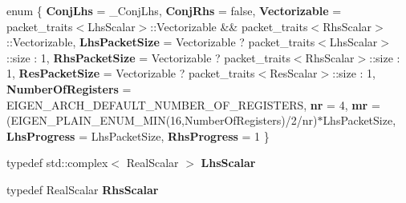 \begin{DoxyCompactItemize}
\item 
\mbox{\label{class_eigen_1_1internal_1_1gebp__traits_3_01std_1_1complex_3_01_real_scalar_01_4_00_01_real_scald728c008ac4da8a5a1327d1e06be8c1f_ac371542e3e56658183b796f8ef01c6f0}} 
enum \{ \newline
{\bfseries Conj\+Lhs} = \+\_\+\+Conj\+Lhs, 
{\bfseries Conj\+Rhs} = false, 
{\bfseries Vectorizable} = packet\+\_\+traits$<$Lhs\+Scalar$>$\+::Vectorizable \&\& packet\+\_\+traits$<$Rhs\+Scalar$>$\+::Vectorizable, 
{\bfseries Lhs\+Packet\+Size} = Vectorizable ? packet\+\_\+traits$<$Lhs\+Scalar$>$\+::size \+: 1, 
\newline
{\bfseries Rhs\+Packet\+Size} = Vectorizable ? packet\+\_\+traits$<$Rhs\+Scalar$>$\+::size \+: 1, 
{\bfseries Res\+Packet\+Size} = Vectorizable ? packet\+\_\+traits$<$Res\+Scalar$>$\+::size \+: 1, 
{\bfseries Number\+Of\+Registers} = E\+I\+G\+E\+N\+\_\+\+A\+R\+C\+H\+\_\+\+D\+E\+F\+A\+U\+L\+T\+\_\+\+N\+U\+M\+B\+E\+R\+\_\+\+O\+F\+\_\+\+R\+E\+G\+I\+S\+T\+E\+RS, 
{\bfseries nr} = 4, 
\newline
{\bfseries mr} = (E\+I\+G\+E\+N\+\_\+\+P\+L\+A\+I\+N\+\_\+\+E\+N\+U\+M\+\_\+\+M\+IN(16,Number\+Of\+Registers)/2/nr)$\ast$\+Lhs\+Packet\+Size, 
{\bfseries Lhs\+Progress} = Lhs\+Packet\+Size, 
{\bfseries Rhs\+Progress} = 1
 \}
\item 
\mbox{\label{class_eigen_1_1internal_1_1gebp__traits_3_01std_1_1complex_3_01_real_scalar_01_4_00_01_real_scald728c008ac4da8a5a1327d1e06be8c1f_a2b869e5cfa1c6be04738920d446eca2b}} 
typedef std\+::complex$<$ Real\+Scalar $>$ {\bfseries Lhs\+Scalar}
\item 
\mbox{\label{class_eigen_1_1internal_1_1gebp__traits_3_01std_1_1complex_3_01_real_scalar_01_4_00_01_real_scald728c008ac4da8a5a1327d1e06be8c1f_a08f811a1d8003e7fe8b193179bc26607}} 
typedef Real\+Scalar {\bfseries Rhs\+Scalar}
\item 
\mbox{\label{class_eigen_1_1internal_1_1gebp__traits_3_01std_1_1complex_3_01_real_scalar_01_4_00_01_real_scald728c008ac4da8a5a1327d1e06be8c1f_a0c5581e83d1752e89a05569c9e5e36f6}} 

\end{DoxyCompactItemize}
